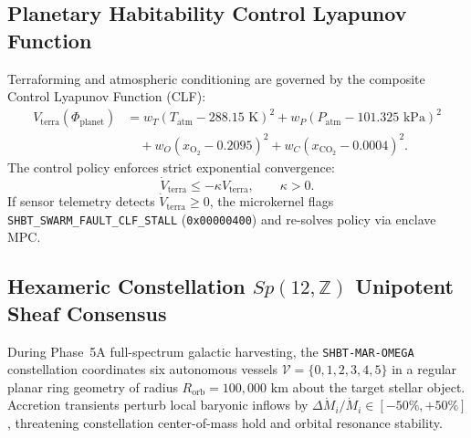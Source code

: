 \documentclass[11pt,onecolumn]{article}
\begin{document}
\FloatBarrier
\subsection{Planetary Habitability Control Lyapunov Function}
Terraforming and atmospheric conditioning are governed by the composite Control Lyapunov Function (CLF):
\begin{equation}
\begin{split}
V_{\text{terra}}(\Phi_{\text{planet}}) &= w_T \left( T_{\text{atm}} - 288.15\text{ K} \right)^2 + w_P \left( P_{\text{atm}} - 101.325\text{ kPa} \right)^2 \\
&\quad + w_O \left( x_{\text{O}_2} - 0.2095 \right)^2 + w_C \left( x_{\text{CO}_2} - 0.0004 \right)^2.
\end{split}
\label{eq:clf_terraforming}
\end{equation}
The control policy enforces strict exponential convergence:
\begin{equation}
\dot{V}_{\text{terra}} \le -\kappa V_{\text{terra}}, \qquad \kappa > 0.
\label{eq:clf_exponential_convergence}
\end{equation}
If sensor telemetry detects $\dot{V}_{\text{terra}} \ge 0$, the microkernel flags \texttt{SHBT\_SWARM\_FAULT\_CLF\_STALL} (\texttt{0x00000400}) and re-solves policy via enclave MPC.

\FloatBarrier

\subsection{Hexameric Constellation \texorpdfstring{$Sp(12, \mathbb{Z})$}{Sp(12, Z)} Unipotent Sheaf Consensus}
\label{subsec:hexamer_unipotent_consensus}

During Phase~5A full-spectrum galactic harvesting, the \texttt{SHBT-MAR-OMEGA} constellation coordinates six autonomous vessels $\mathcal{V} = \{0, 1, 2, 3, 4, 5\}$ in a regular planar ring geometry of radius $R_{\text{orb}} = 100{,}000\text{ km}$ about the target stellar object. Accretion transients perturb local baryonic inflows by $\Delta \dot{M}_i / \dot{M}_i \in [-50\%, +50\%]$, threatening constellation center-of-mass hold and orbital resonance stability.
\end{document}
